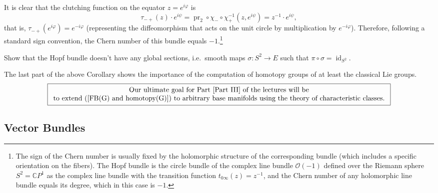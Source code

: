 \documentclass[english,letterpaper]{article}%
\numberwithin{equation}{section}
\numberwithin{figure}{section}
\numberwithin{table}{section}
\theoremstyle{definition}
\theoremstyle{definition}
\theoremstyle{definition}
\theoremstyle{plain}
\theoremstyle{plain}
\theoremstyle{plain}
\theoremstyle{plain}
\theoremstyle{remark}
\theoremstyle{remark}
\def\red{\color{red}}
\DeclareMathOperator{\id}{id}
\DeclareMathOperator{\pr}{pr}
\newcommand{\PRLsep}{   %
           \noindent\makebox[\linewidth]{
                \resizebox{0.5\linewidth}{1pt}{$\blacklozenge$}}}
\begin{document}
\begin{example}
    It is clear that the clutching function on the equator $z=e^{i\varphi}$ is 
    \[\tau_{-+}(z)\cdot e^{i\psi}=\pr_2\circ \chi_-\circ \chi_+^{-1}(z,e^{i\psi})=z^{-1}\cdot e^{i\psi},\]
    that is, $\tau_{-+}(e^{i\varphi})=e^{-i\varphi}$ (representing the diffeomorphism that acts on the unit circle by multiplication by $e^{-i\varphi}$). Therefore, following a standard sign convention, the Chern number of this bundle equals $-1$.\footnote{The sign of the Chern number is usually fixed by the holomorphic structure of the corresponding bundle (which includes a specific orientation on the fibers). The Hopf bundle is the circle bundle of the complex line bundle $\mathcal{O}(-1)$ defined over the Riemann sphere $S^2=\mathbb{C}P^1$ as the complex line bundle with the transition function $t_{0\infty}(z)=z^{-1}$, and the Chern number of any holomorphic line bundle equals its degree, which in this case is $-1$.}
\end{example}

\begin{xca}
    Show that the Hopf bundle doesn't have any global sections, i.e.\ smooth maps $\sigma:S^2\to E$ such that $\pi\circ\sigma=\id_{S^2}$.
\end{xca}

The last part of the above Corollary shows the importance of the computation of homotopy groups of at least the classical Lie groups. 
\[\boxed{\begin{array}{c}
    \text{Our ultimate goal for Part \ref{Part III} of the lectures will be}\\ 
    \text{to extend (\ref{FB(G) and homotopy(G)}) to arbitrary base manifolds using the theory of characteristic classes.}
\end{array}}
\] 

\subsection{Vector Bundles}
\end{document}
